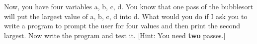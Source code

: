 Now, you have four variables a, b, c, d. You know that one pass of the bubblesort will put the largest value of a, b, c, d into d. What would you do if I ask you to write a program to prompt the user for four values and then print the second largest. Now write the program and test it. [Hint: You need \textbf{two} passes.]

